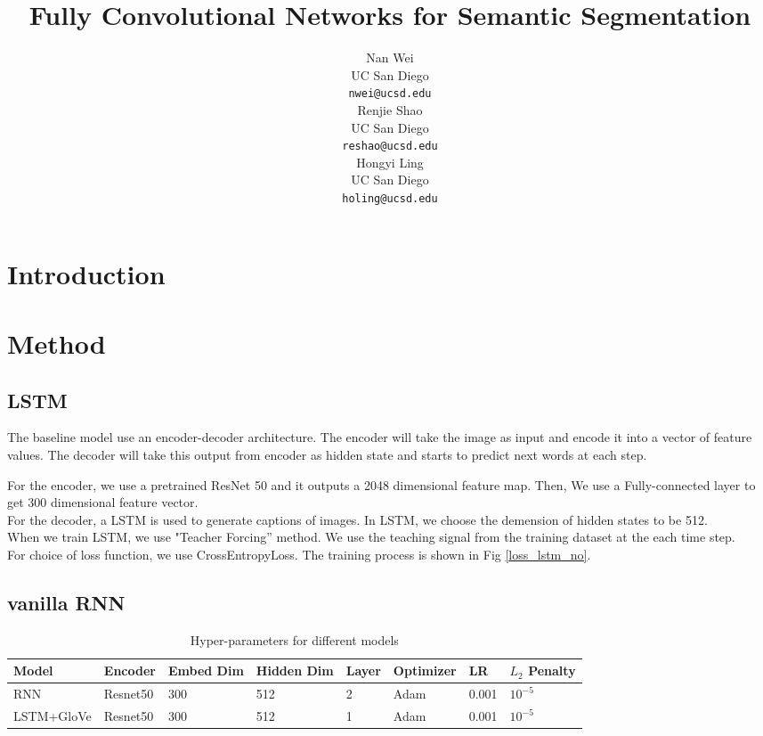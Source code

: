 \documentclass{article} %
\title{Fully Convolutional Networks for Semantic
Segmentation}
\author{
Nan Wei \\
UC San Diego\\
\texttt{nwei@ucsd.edu} \\
\And
Renjie Shao \\
UC San Diego \\
\texttt{reshao@ucsd.edu} \\
\And
Hongyi Ling \\
UC San Diego \\
\texttt{holing@ucsd.edu} \\
}
\begin{document}
\maketitle

\begin{abstract}

\end{abstract}

\section{Introduction}


\section{Method}
\subsection{LSTM}
The baseline model use an encoder-decoder architecture. 
The encoder will take the image as input and encode it into a vector of feature values.
 The decoder will take this output from encoder as hidden state and starts to predict next words at each step.

 For the encoder, we use a pretrained ResNet 50 and it outputs a  2048 dimensional feature map. Then, We use a Fully-connected layer to get 300 dimensional feature vector. \\
 For the decoder, a LSTM is used to generate captions of images. In LSTM, we choose the demension of hidden states to be 512. \\
 When we train LSTM, we use "Teacher Forcing” method. We use the teaching signal from the training dataset at the each time step.\\
 For choice of loss function, we use CrossEntropyLoss. The training process is shown in Fig \ref{loss_lstm_no}.
\subsection{vanilla RNN}

\begin{table}[!htb]
    \centering
    \begin{tabular}{l|l|l|l|l|l|l|l}
        \hline
        Model & Encoder & Embed Dim & Hidden Dim & Layer &  Optimizer & LR & $L_2$ Penalty \\
		\hline
        RNN & Resnet50 & 300 & 512 & 2 & Adam & 0.001 & $10^{-5}$ \\
	    \hline
		LSTM+GloVe& Resnet50 & 300 & 512 & 1 & Adam & 0.001 & $10^{-5}$ \\
	    \hline
    \end{tabular}
    \caption{Hyper-parameters for different models}
    \label{acc}
\end{table}
\end{document}
